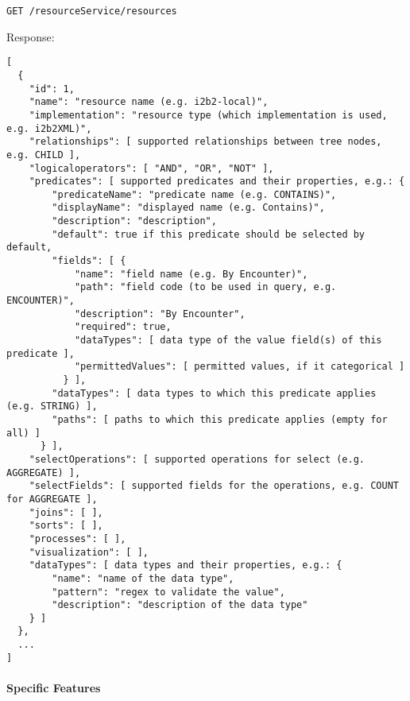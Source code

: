 \newpage
\begin{verbatim}
GET /resourceService/resources
\end{verbatim}

Response:
\begin{verbatim}
[
  {
    "id": 1,
    "name": "resource name (e.g. i2b2-local)",
    "implementation": "resource type (which implementation is used, e.g. i2b2XML)",
    "relationships": [ supported relationships between tree nodes, e.g. CHILD ],
    "logicaloperators": [ "AND", "OR", "NOT" ],
    "predicates": [ supported predicates and their properties, e.g.: {
        "predicateName": "predicate name (e.g. CONTAINS)",
        "displayName": "displayed name (e.g. Contains)",
        "description": "description",
        "default": true if this predicate should be selected by default,
        "fields": [ {
            "name": "field name (e.g. By Encounter)",
            "path": "field code (to be used in query, e.g. ENCOUNTER)",
            "description": "By Encounter",
            "required": true,
            "dataTypes": [ data type of the value field(s) of this predicate ],
            "permittedValues": [ permitted values, if it categorical ]
          } ],
        "dataTypes": [ data types to which this predicate applies (e.g. STRING) ],
        "paths": [ paths to which this predicate applies (empty for all) ]
      } ],
    "selectOperations": [ supported operations for select (e.g. AGGREGATE) ],
    "selectFields": [ supported fields for the operations, e.g. COUNT for AGGREGATE ],
    "joins": [ ],
    "sorts": [ ],
    "processes": [ ],
    "visualization": [ ],
    "dataTypes": [ data types and their properties, e.g.: {
        "name": "name of the data type",
        "pattern": "regex to validate the value",
        "description": "description of the data type"
    } ]
  },
  ...
]
\end{verbatim}


\paragraph{Specific Features}
\label{sec:specific-features}

